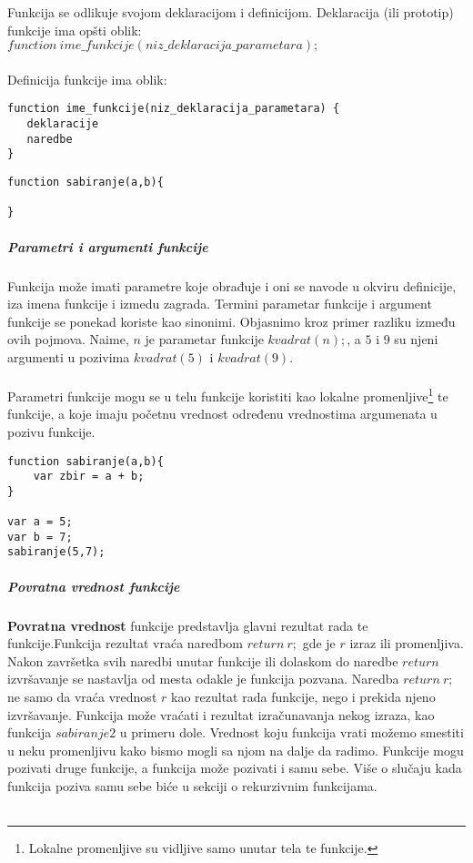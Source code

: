 Funkcija se odlikuje svojom deklaracijom i definicijom.
Deklaracija (ili prototip) funkcije ima opšti oblik:\\
$function\ ime\_funkcije(niz\_deklaracija\_parametara);$\\\\
Definicija funkcije ima oblik:
\begin{verbatim}
function ime_funkcije(niz_deklaracija_parametara) {
   deklaracije
   naredbe
}
\end{verbatim}
\begin{lstlisting}[backgroundcolor = \color{lightgray}, breaklines=true]
function sabiranje(a,b){

}
\end{lstlisting}

\subparagraph{Parametri i argumenti funkcije}
Funkcija može imati parametre koje obrađuje i oni se navode u
okviru definicije, iza imena funkcije i izmedu zagrada.
Termini parametar funkcije i argument funkcije se ponekad
koriste kao sinonimi. Objasnimo kroz primer razliku između ovih pojmova. Naime,  $n$ je parametar funkcije $kvadrat(n);$, a $5$ i $9$ su
njeni argumenti u pozivima $kvadrat(5)$ i $kvadrat(9)$.\\\\
Parametri funkcije mogu se u telu funkcije koristiti kao lokalne
promenljive\footnote{Lokalne promenljive su vidljive samo unutar tela te funkcije.} te funkcije, a koje imaju početnu vrednost
određenu vrednostima argumenata u pozivu funkcije.
\begin{lstlisting}[backgroundcolor = \color{lightgray}, breaklines=true]
function sabiranje(a,b){
	var zbir = a + b;
}

var a = 5;
var b = 7;
sabiranje(5,7);
\end{lstlisting}

\subparagraph{Povratna vrednost funkcije}
\textbf{Povratna vrednost} funkcije predstavlja glavni rezultat rada te funkcije.Funkcija rezultat vraća naredbom $return\ r;$ gde je $r$ izraz ili promenljiva. Nakon završetka svih naredbi unutar funkcije ili dolaskom do naredbe $return$ izvršavanje se nastavlja od mesta odakle je funkcija pozvana.
Naredba $return\ r;$ ne samo da vraća vrednost $r$ kao rezultat
rada funkcije, nego i prekida njeno izvršavanje. Funkcija može vraćati i rezultat izračunavanja nekog izraza, kao funkcija $sabiranje2$ u primeru dole. Vrednost koju funkcija vrati možemo smestiti u neku promenljivu kako bismo mogli sa njom na dalje da radimo. Funkcije mogu pozivati druge funkcije, a funkcija može pozivati i samu sebe. Više o slučaju kada funkcija poziva samu sebe biće u sekciji o rekurzivnim funkcijama.\\\\

